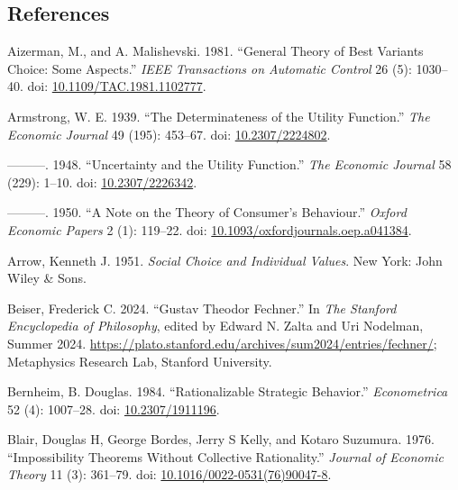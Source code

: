 \documentclass[
  11pt,
  letterpaper,
  DIV=11,
  numbers=noendperiod,
  twoside]{scrartcl}
\newlength{\cslhangindent}
\newenvironment{CSLReferences}[2] %
 {\begin{list}{}{%
  \setlength{\itemindent}{0pt}
  \setlength{\leftmargin}{0pt}
  \setlength{\parsep}{0pt}
  \ifodd #1
   \setlength{\leftmargin}{\cslhangindent}
   \setlength{\itemindent}{-1\cslhangindent}
  \fi
  \setlength{\itemsep}{#2\baselineskip}}}
 {\end{list}}
\begin{document}
\subsection*{References}\label{references}

\label{refs}
\begin{CSLReferences}{1}{0}
Aizerman, M., and A. Malishevski. 1981. {``General Theory of Best
Variants Choice: Some Aspects.''} \emph{IEEE Transactions on Automatic
Control} 26 (5): 1030--40. doi:
\href{https://doi.org/10.1109/TAC.1981.1102777}{10.1109/TAC.1981.1102777}.

Armstrong, W. E. 1939. {``The Determinateness of the Utility
Function.''} \emph{The Economic Journal} 49 (195): 453--67. doi:
\href{https://doi.org/10.2307/2224802}{10.2307/2224802}.

---------. 1948. {``Uncertainty and the Utility Function.''} \emph{The
Economic Journal} 58 (229): 1--10. doi:
\href{https://doi.org/10.2307/2226342}{10.2307/2226342}.

---------. 1950. {``A Note on the Theory of Consumer's Behaviour.''}
\emph{Oxford Economic Papers} 2 (1): 119--22. doi:
\href{https://doi.org/10.1093/oxfordjournals.oep.a041384}{10.1093/oxfordjournals.oep.a041384}.

Arrow, Kenneth J. 1951. \emph{Social Choice and Individual Values}. New
York: John Wiley \& Sons.

Beiser, Frederick C. 2024. {``{Gustav Theodor Fechner}.''} In \emph{The
{Stanford} Encyclopedia of Philosophy}, edited by Edward N. Zalta and
Uri Nodelman, {S}ummer 2024.
\url{https://plato.stanford.edu/archives/sum2024/entries/fechner/};
Metaphysics Research Lab, Stanford University.

Bernheim, B. Douglas. 1984. {``Rationalizable Strategic Behavior.''}
\emph{Econometrica} 52 (4): 1007--28. doi:
\href{https://doi.org/10.2307/1911196}{10.2307/1911196}.

Blair, Douglas H, George Bordes, Jerry S Kelly, and Kotaro Suzumura.
1976. {``Impossibility Theorems Without Collective Rationality.''}
\emph{Journal of Economic Theory} 11 (3): 361--79. doi:
\href{https://doi.org/10.1016/0022-0531(76)90047-8}{10.1016/0022-0531(76)90047-8}.


\end{CSLReferences}
\end{document}

